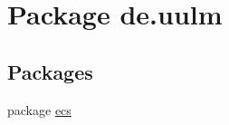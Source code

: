 \hypertarget{namespacede_1_1uulm}{\section{Package de.\-uulm}
\label{namespacede_1_1uulm}
}
\subsection*{Packages}
\begin{DoxyCompactItemize}
\item 
package \hyperlink{namespacede_1_1uulm_1_1ecs}{ecs}
\end{DoxyCompactItemize}
